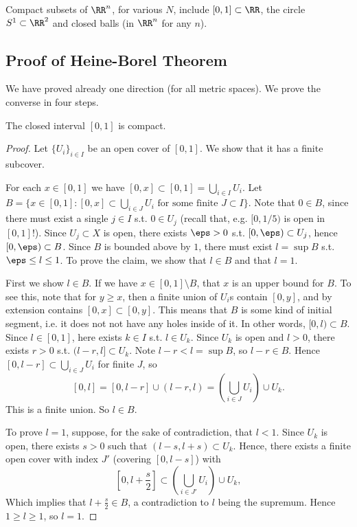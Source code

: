 \begin{example}
  Compact subsets of $\RR^n$, for various $N$, include $[0,1]\subset\RR$, the
  circle $S^1\subset\RR^2$ and closed balls (in $\RR^n$ for any $n$).
\end{example}

\subsection{Proof of Heine-Borel Theorem}
We have proved already one direction (for all metric spaces). We prove the
converse in four steps.
\begin{theorem}
  The closed interval $[0,1]$ is compact. 
  \label{<+label+>}
\end{theorem}
\begin{proof}
  Let $\{U_i\}_{i\in I}$ be an open cover of $[0,1]$. We show that it has a
  finite subcover. 

  For each $x\in [0,1]$ we have $[0,x]\subset[0,1] =\bigcup_{i\in I}U_i$. Let
  $B=\{ x\in[0,1] : [0,x]\subset  \bigcup_{i\in J}U_i \text{ for some finite }
  J\subset I\}.$
  Note that $0\in B$, since there must exist a single $j\in I$ s.t. $0\in U_j$
  (recall that, e.g. $[0,1/5)$ is open in $[0,1]$!). Since $U_j\subset X$ is
  open, there exists $\eps>0$ s.t. $[0,\eps)\subset U_j$, hence $[0,\eps)\subset
  B$. Since $B$ is bounded above by $1$, there must exist $l=\sup B$ s.t.
  $\eps\leq l\leq 1$. To prove the claim, we show that $l\in B$ and that $l=1$.

  First we show $l\in B$. If we have $x\in [0,1]\setminus B$, that $x$ is an
  upper bound for $B$. To see this, note that for $y\geq x$, then a finite union
  of $U_i$s contain $[0,y]$, and by extension contains $[0,x]\subset[0,y]$. This
  means that $B$ is some kind of initial segment, i.e. it does not not have any
  holes inside of it. In other words, $[0,l)\subset B$. Since $l\in [0,1]$, here
  exists $k\in I$ s.t. $l\in U_k$. Since $U_k$ is open and $l>0$, there exists
  $r>0$ s.t. $(l-r, l]\subset U_k$. Note $l-r<l=\sup B$, so $l-r\in B$. Hence
  $[0,l-r]\subset \bigcup_{i\in J}U_i$ for finite $J$, so 
  \[ [0,l] = [0,l-r] \cup (l-r, l ) = (\bigcup_{i\in J}U_i)\cup U_k.\]
  This is a finite union. So $l\in B$.

  To prove $l=1$, suppose, for the sake of contradiction, that $l<1$. Since
  $U_k$ is open, there exists $s>0$ such that $(l-s, l+s)\subset U_k$. Hence,
  there exists a finite open cover with index $J'$ (covering $[0,l-s]$) with 
  \[ [0,l+\frac{s}{2}] \subset (\bigcup_{i\in J'}U_i)\cup U_k,\]
  Which implies that $l+\frac{s}{2}\in B$, a contradiction to $l$ being the
  supremum. Hence $1\geq l\geq 1$, so $l=1$.
\end{proof}

